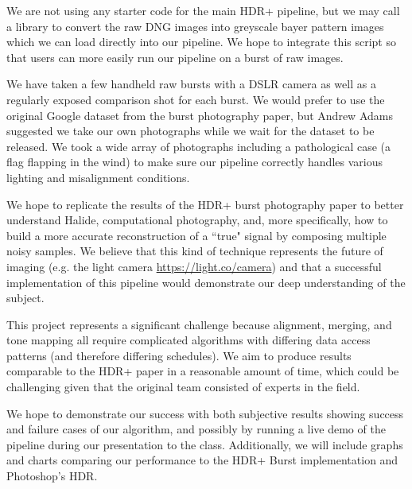 \documentclass[12pt]{exam}
\newcommand{\sol}[1]{\leavevmode \begin{solution} #1 \end{solution}}
\begin{document}
\begin{questions}

    \sol{
    We are not using any starter code for the main HDR+ pipeline, but we may call a library to convert the raw DNG images into greyscale bayer pattern images which we can load directly into our pipeline. We hope to integrate this script so that users can more easily run our pipeline on a burst of raw images.
    }


    \sol{
    We have taken a few handheld raw bursts with a DSLR camera as well as a regularly exposed comparison shot for each burst. We would prefer to use the original Google dataset from the burst photography paper, but Andrew Adams suggested we take our own photographs while we wait for the dataset to be released. We took a wide array of photographs including a pathological case (a flag flapping in the wind) to make sure our pipeline correctly handles various lighting and misalignment conditions.
    }


    \sol{
    We hope to replicate the results of the HDR+ burst photography paper to better understand Halide, computational photography, and, more specifically, how to build a more accurate reconstruction of a ``true" signal by composing multiple noisy samples. We believe that this kind of technique represents the future of imaging (e.g. the light camera \url{https://light.co/camera}) and that a successful implementation of this pipeline would demonstrate our deep understanding of the subject.

    This project represents a significant challenge because alignment, merging, and tone mapping all require complicated algorithms with differing data access patterns (and therefore differing schedules). We aim to produce results comparable to the HDR+ paper in a reasonable amount of time, which could be challenging given that the original team consisted of experts in the field.

    We hope to demonstrate our success with both subjective results showing success and failure cases of our algorithm, and possibly by running a live demo of the pipeline during our presentation to the class. Additionally, we will include graphs and charts comparing our performance to the HDR+ Burst implementation and Photoshop's HDR.
    }
    

\end{questions}
\end{document}
